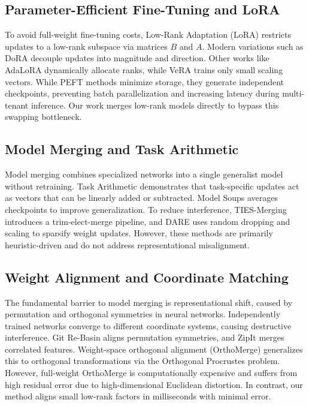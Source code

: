 \documentclass{article}
\theoremstyle{plain}
\theoremstyle{definition}
\theoremstyle{remark}
\begin{document}
\subsection{Parameter-Efficient Fine-Tuning and LoRA}
To avoid full-weight fine-tuning costs, Low-Rank Adaptation (LoRA) \cite{hu2021lora} restricts updates to a low-rank subspace via matrices $B$ and $A$. Modern variations such as DoRA \cite{liu2024dora} decouple updates into magnitude and direction. Other works like AdaLoRA dynamically allocate ranks, while VeRA trains only small scaling vectors. While PEFT methods minimize storage, they generate independent checkpoints, preventing batch parallelization and increasing latency during multi-tenant inference. Our work merges low-rank models directly to bypass this swapping bottleneck.

\subsection{Model Merging and Task Arithmetic}
Model merging combines specialized networks into a single generalist model without retraining. Task Arithmetic \cite{ilharco2022editing} demonstrates that task-specific updates act as vectors that can be linearly added or subtracted. Model Soups \cite{Wortsman2022model} averages checkpoints to improve generalization. To reduce interference, TIES-Merging \cite{yadav23ties} introduces a trim-elect-merge pipeline, and DARE \cite{yu2024dare} uses random dropping and scaling to sparsify weight updates. However, these methods are primarily heuristic-driven and do not address representational misalignment.

\subsection{Weight Alignment and Coordinate Matching}
The fundamental barrier to model merging is representational shift, caused by permutation and orthogonal symmetries in neural networks. Independently trained networks converge to different coordinate systems, causing destructive interference. Git Re-Basin \cite{ainsworth2022git} aligns permutation symmetries, and ZipIt \cite{stoica2023zip} merges correlated features. Weight-space orthogonal alignment (OrthoMerge) \cite{sa-ortho} generalizes this to orthogonal transformations via the Orthogonal Procrustes problem. However, full-weight OrthoMerge is computationally expensive and suffers from high residual error due to high-dimensional Euclidean distortion. In contrast, our method aligns small low-rank factors in milliseconds with minimal error.
\end{document}
